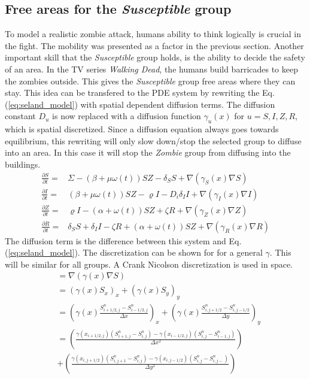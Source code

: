 \documentclass[%
twoside,                 %
final,                   %
10pt]{article}
\begin{document}
\subsection{Free areas for the \emph{Susceptible} group}
To model a realistic zombie attack, humans ability to think logically is crucial in the fight. The mobility was presented as a factor in the previous section. Another important skill that the \emph{Susceptible} group holds, is the ability to decide the safety of an area. In the TV series \emph{Walking Dead}, the humans build barricades to keep the zombies outside. This gives the \emph{Susceptible} group free areas where they can stay. This idea can be transfered to the PDE system by rewriting the Eq.(\ref{eq:seland_model}) with spatial dependent diffusion terms. The diffusion constant $D_u$ is now replaced with a diffusion function $\gamma_u(x)$ for $u= S,I,Z,R$, which is spatial discretized. Since a diffusion equation always goes towards equilibrium, this rewriting will only slow down/stop the selected group to diffuse into an area. In this case it will stop the \emph{Zombie} group from diffusing into the buildings. 
\begin{equation} \label{eq:seland_model_diff}
    \begin{aligned} 
    \frac{\partial S}{\partial t} =& \Sigma -(\beta+\mu \omega(t))SZ - \delta_SS +\nabla(\gamma_S(x) \nabla S) \\
    \frac{\partial I}{\partial t} =& (\beta+\mu \omega(t))SZ - \varrho I - D_i\delta_II+\nabla(\gamma_I(x) \nabla I)\\
    \frac{\partial Z}{\partial t} =& \varrho I- (\alpha+\omega(t))SZ + \zeta R+\nabla(\gamma_Z(x) \nabla Z)\\
    \frac{\partial R}{\partial t} =& \delta_SS +\delta_II -\zeta R + (\alpha+\omega(t))SZ+\nabla(\gamma_R(x) \nabla R) 
    \end{aligned}
\end{equation}
The diffusion term is the difference between this system and Eq.(\ref{eq:seland_model}). The discretization can be shown for for a general $\gamma$. This will be similar for all groups. A Crank Nicolson discretization is used in space.
\begin{equation} \label{eq:gamma}
    \begin{aligned}
    &=\nabla(\gamma(x) \nabla S) \\
    &=(\gamma(x) S_x)_x+(\gamma(x) S_y)_y \\
    &= \left(\gamma(x) \frac{S^{n}_{i+1/2,j}-S^{n}_{i-1/2,j}}{\Delta x}\right)_x+\left(\gamma(x) \frac{S^{n}_{i,j+1/2}-S^{n}_{i,j-1/2}}{\Delta y}\right)_y \\
    &= \left(\frac{\gamma(x_{i+1/2,j})(S^{n}_{i+1,j}-S^{n}_{i,j})-\gamma(x_{i-1/2,j})(S^{n}_{i,j}-S^{n}_{i-1,j})}{\Delta x^2}\right) \\
    &+ \left(\frac{\gamma(x_{i,j+1/2})(S^{n}_{i,j+1}-S^{n}_{i,j})-\gamma(x_{i,j-1/2})(S^{n}_{i,j}-S^{n}_{i,j-})}{\Delta y^2}\right)
    \end{aligned}
\end{equation}
\end{document}
